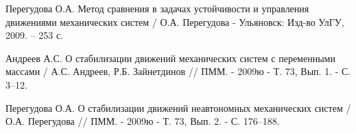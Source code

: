\begin{thebibliography}{10}
	Перегудова О.А. Метод сравнения в задачах устойчивости и управления движениями механических систем / О.А. Перегудова - Ульяновск: Изд-во УлГУ, 2009. -- 253 с.
	
	Андреев А.С. О стабилизации движений механических систем с переменными массами / А.С. Андреев, Р.Б. Зайнетдинов // ПММ. - 2009ю - Т. 73, Вып. 1. - С. 3--12.
	
	Перегудова О.А. О стабилизации движений неавтономных механических систем / О.А. Перегудова // ПММ. - 2009ю - Т. 73, Вып. 2. - С. 176--188.
	
	
\end{thebibliography} 